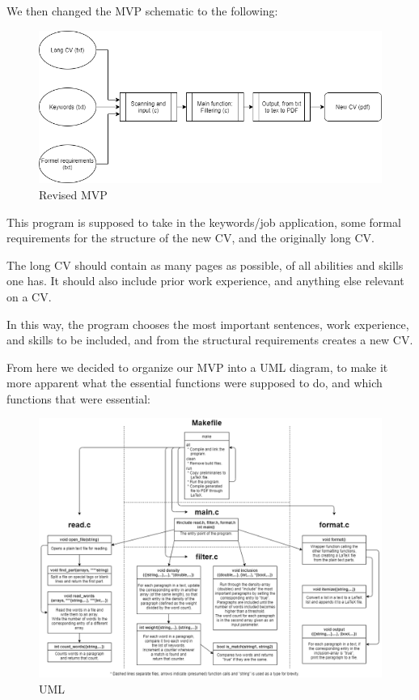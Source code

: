 We then changed the MVP schematic to the following:
\begin{figure}[H]
  \centering
  \includegraphics[scale = 0.6]{figures/Program_process_diagram.png}
  \caption{Revised MVP}
\end{figure}
This program is supposed to take in the keywords/job application, some formal requirements for
the structure of the new CV, and the originally long CV.
 
The long CV should contain as many pages as possible, of all abilities and skills one has.
It should also include prior work experience, and anything else relevant on a CV. 

In this way, the program chooses the most important sentences, work experience, and skills to be included,
and from the structural requirements creates a new CV.

From here we decided to organize our MVP into a UML diagram, to make it more apparent
what the essential functions were supposed to do, and which functions that were essential:
\begin{figure}[H]
  \raggedright
  \hspace*{-1in}
  \includegraphics[scale = 0.50,left]{figures/UML}
  \caption{UML}
  \label{fig:UML}
\end{figure}
\newpage

